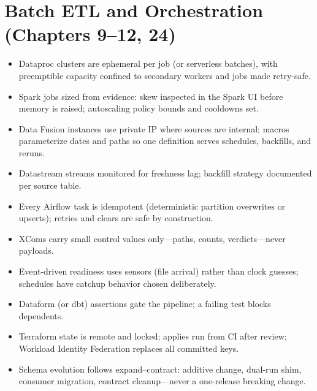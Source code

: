 \section{Batch ETL and Orchestration (Chapters 9--12, 24)}
\begin{itemize}
    \item[$\square$] Dataproc clusters are ephemeral per job (or serverless batches), with
    preemptible capacity confined to secondary workers and jobs made retry-safe.
    \item[$\square$] Spark jobs sized from evidence: skew inspected in the Spark UI before memory
    is raised; autoscaling policy bounds and cooldowns set.
    \item[$\square$] Data Fusion instances use private IP where sources are internal; macros
    parameterize dates and paths so one definition serves schedules, backfills, and reruns.
    \item[$\square$] Datastream streams monitored for freshness lag; backfill strategy documented
    per source table.
    \item[$\square$] Every Airflow task is idempotent (deterministic partition overwrites or
    upserts); retries and clears are safe by construction.
    \item[$\square$] XComs carry small control values only---paths, counts, verdicts---never
    payloads.
    \item[$\square$] Event-driven readiness uses sensors (file arrival) rather than clock guesses;
    schedules have catchup behavior chosen deliberately.
    \item[$\square$] Dataform (or dbt) assertions gate the pipeline; a failing test blocks
    dependents.
    \item[$\square$] Terraform state is remote and locked; applies run from CI after review;
    Workload Identity Federation replaces all committed keys.
    \item[$\square$] Schema evolution follows expand--contract: additive change, dual-run shim,
    consumer migration, contract cleanup---never a one-release breaking change.
\end{itemize}


